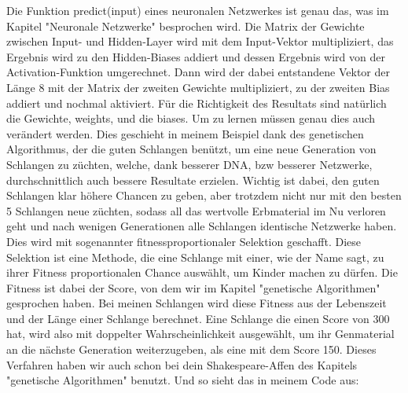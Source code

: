 \documentclass[10pt,a4paper,ngerman,english]{article}
\begin{document}
Die Funktion predict(input) eines neuronalen Netzwerkes ist genau das, was im Kapitel "Neuronale Netzwerke" besprochen wird. Die Matrix der Gewichte zwischen Input- und Hidden-Layer wird mit dem Input-Vektor multipliziert, das Ergebnis wird zu den Hidden-Biases addiert und dessen Ergebnis wird von der Activation-Funktion umgerechnet. Dann wird der dabei entstandene Vektor der Länge 8 mit der Matrix der zweiten Gewichte multipliziert, zu der zweiten Bias addiert und nochmal aktiviert. Für die Richtigkeit des Resultats sind natürlich die Gewichte, weights, und die biases. Um zu lernen müssen genau dies auch verändert werden. Dies geschieht in meinem Beispiel dank des genetischen Algorithmus, der die guten Schlangen benützt, um eine neue Generation von Schlangen zu züchten, welche, dank besserer DNA, bzw besserer Netzwerke, durchschnittlich auch bessere Resultate erzielen. Wichtig ist dabei, den guten Schlangen klar höhere Chancen zu geben, aber trotzdem nicht nur mit den besten 5 Schlangen neue züchten, sodass all das wertvolle Erbmaterial im Nu verloren geht und nach wenigen Generationen alle Schlangen identische Netzwerke haben. Dies wird mit sogenannter fitnessproportionaler Selektion geschafft. Diese Selektion ist eine Methode, die eine Schlange mit einer, wie der Name sagt, zu ihrer Fitness proportionalen Chance auswählt, um Kinder machen zu dürfen. Die Fitness ist dabei der Score, von dem wir im Kapitel "genetische Algorithmen" gesprochen haben. Bei meinen Schlangen wird diese Fitness aus der Lebenszeit und der Länge einer Schlange berechnet. Eine Schlange die einen Score von 300 hat, wird also mit doppelter Wahrscheinlichkeit ausgewählt, um ihr Genmaterial an die nächste Generation weiterzugeben, als eine mit dem Score 150. Dieses Verfahren haben wir auch schon bei dein Shakespeare-Affen des Kapitels "genetische Algorithmen" benutzt. Und so sieht 
das in meinem Code aus:
\end{document}
